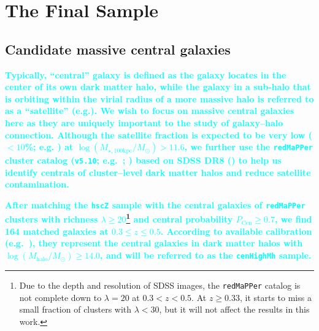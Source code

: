 \documentclass[a4paper,fleqn,usenatbib]{mnras}
\def\redm{\texttt{redMaPPer}}
\def\rbcg{\texttt{cenHighMh}}
\def\logmtot{{$\log (M_{\star,100\mathrm{kpc}}/M_{\odot})$}}
\newcommand{\song}[1]{\textcolor{cyan}{\textbf{#1}}}
\begin{document}
\section{The Final Sample}
    \label{sec:final}
    
\subsection{Candidate massive central galaxies}
    \label{ssec:redmapper}
    
    \song{
    Typically, ``central'' galaxy is defined as the galaxy locates in the center of 
    its own dark matter halo, while the galaxy in a sub-halo that is orbiting within 
    the virial radius of a more massive halo is referred to as a ``satellite'' 
    (e.g.\citealt{Yang2007}).
    We wish to focus on massive central galaxies here as they are uniquely important 
    to the study of galaxy--halo connection.
    Although the satellite fraction is expected to be very low ($<10$\%; e.g. 
    \citealt{Reid2014, Hoshino2015, Saito2016}) at \logmtot{}$> 11.6$, we further use 
    the \redm{} cluster catalog (\texttt{v5.10}; e.g.\ \citealt{Rykoff2014}; 
    \citealt{Rozo2015b}) based on SDSS DR8 (\citealt{SDSS-DR8}) to help us 
    identify centrals of cluster--level dark matter halos and reduce satellite
    contamination.
    }
    
    \song{    
    After matching the \texttt{hscZ} sample with the central galaxies of \redm{} 
    clusters with richness $\lambda \geq 20$\footnote{Due to the depth and 
    resolution of SDSS images, the \redm{} catalog is not complete down to 
    $\lambda=20$ at $0.3 < z < 0.5$.  
    At $z \geq 0.33$, it starts to miss a small fraction of clusters with 
    $\lambda < 30$, but it will not affect the results in this work.}
    and central probability $P_{\mathrm{Cen}} \geq 0.7$, we find 164 matched galaxies 
    at $0.3 \leq z \leq 0.5$.
    According to available calibration (e.g.\ \citealt{Saro2015, Farahi2016, 
    Simet2016, Melchior2016}), they represent the central galaxies in dark matter 
    halos with $\log (M_{\mathrm{halo}}/M_{\odot}) \geq 14.0$, and will be 
    referred to as the \rbcg{} sample. 
    }
\end{document}
